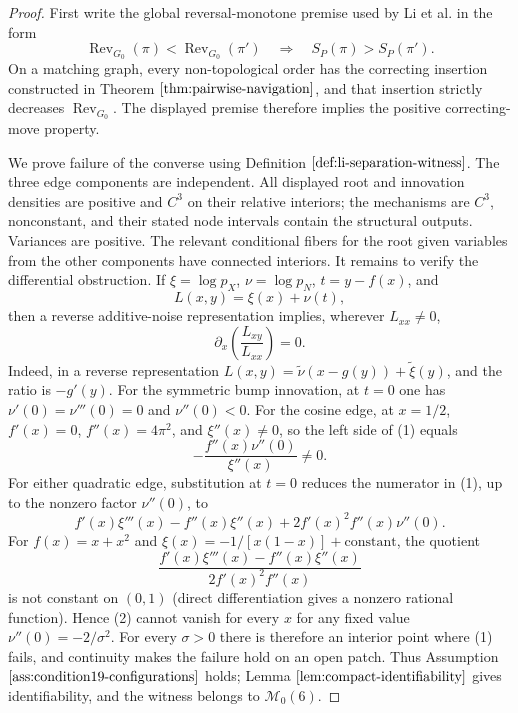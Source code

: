 \documentclass{article}
\begin{document}
\begin{proof}
First write the global reversal-monotone premise used by Li et al. in the form
\[
 \operatorname{Rev}_{G_0}(\pi)<\operatorname{Rev}_{G_0}(\pi')
 \quad\Longrightarrow\quad S_P(\pi)>S_P(\pi').
\]
On a matching graph, every non-topological order has the correcting insertion constructed in Theorem \(\ref{thm:pairwise-navigation}\), and that insertion strictly decreases \(\operatorname{Rev}_{G_0}\).  The displayed premise therefore implies the positive correcting-move property.

We prove failure of the converse using Definition \(\ref{def:li-separation-witness}\).  The three edge components are independent.  All displayed root and innovation densities are positive and \(C^3\) on their relative interiors; the mechanisms are \(C^3\), nonconstant, and their stated node intervals contain the structural outputs.  Variances are positive.  The relevant conditional fibers for the root given variables from the other components have connected interiors.  It remains to verify the differential obstruction.  If \(\xi=\log p_X\), \(\nu=\log p_N\), \(t=y-f(x)\), and
\[
 L(x,y)=\xi(x)+\nu(t),
\]
then a reverse additive-noise representation implies, wherever \(L_{xx}\ne0\),
\[
 \partial_x\!\left(\frac{L_{xy}}{L_{xx}}\right)=0. \tag{1}
\]
Indeed, in a reverse representation \(L(x,y)=\widetilde\nu(x-g(y))+\widetilde\xi(y)\), and the ratio is \(-g'(y)\).  For the symmetric bump innovation, at \(t=0\) one has \(\nu'(0)=\nu'''(0)=0\) and \(\nu''(0)<0\).  For the cosine edge, at \(x=1/2\), \(f'(x)=0\), \(f''(x)=4\pi^2\), and \(\xi''(x)\ne0\), so the left side of (1) equals
\[
 -\frac{f''(x)\nu''(0)}{\xi''(x)}\ne0.
\]
For either quadratic edge, substitution at \(t=0\) reduces the numerator in (1), up to the nonzero factor \(\nu''(0)\), to
\[
 f'(x)\xi'''(x)-f''(x)\xi''(x)+2f'(x)^2f''(x)\nu''(0). \tag{2}
\]
For \(f(x)=x+x^2\) and \(\xi(x)=-1/[x(1-x)]+\mathrm{constant}\), the quotient
\[
 \frac{f'(x)\xi'''(x)-f''(x)\xi''(x)}{2f'(x)^2f''(x)}
\]
is not constant on \((0,1)\) (direct differentiation gives a nonzero rational function).  Hence (2) cannot vanish for every \(x\) for any fixed value \(\nu''(0)=-2/\sigma^2\).  For every \(\sigma>0\) there is therefore an interior point where (1) fails, and continuity makes the failure hold on an open patch.  Thus Assumption \(\ref{ass:condition19-configurations}\) holds; Lemma \(\ref{lem:compact-identifiability}\) gives identifiability, and the witness belongs to \(\mathcal M_0(6)\).


\end{proof}
\end{document}
